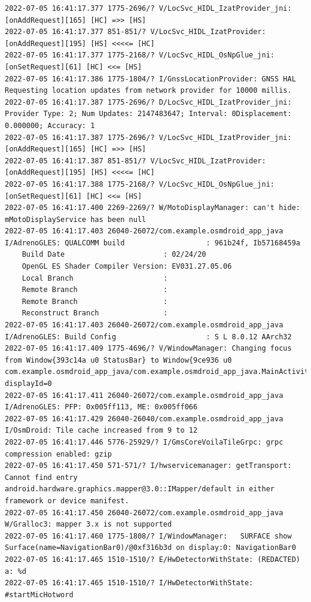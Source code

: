 \documentclass[a4paper,12pt]{book}
\begin{document}
\begin{lstlisting}
2022-07-05 16:41:17.377 1775-2696/? V/LocSvc_HIDL_IzatProvider_jni: [onAddRequest][165] [HC] =>> [HS]
2022-07-05 16:41:17.377 851-851/? V/LocSvc_HIDL_IzatProvider: [onAddRequest][195] [HS] <<<<= [HC]
2022-07-05 16:41:17.377 1775-2168/? V/LocSvc_HIDL_OsNpGlue_jni: [onSetRequest][61] [HC] <<= [HS]
2022-07-05 16:41:17.386 1775-1804/? I/GnssLocationProvider: GNSS HAL Requesting location updates from network provider for 10000 millis.
2022-07-05 16:41:17.387 1775-2696/? D/LocSvc_HIDL_IzatProvider_jni: Provider Type: 2; Num Updates: 2147483647; Interval: 0Displacement: 0.000000; Accuracy: 1
2022-07-05 16:41:17.387 1775-2696/? V/LocSvc_HIDL_IzatProvider_jni: [onAddRequest][165] [HC] =>> [HS]
2022-07-05 16:41:17.387 851-851/? V/LocSvc_HIDL_IzatProvider: [onAddRequest][195] [HS] <<<<= [HC]
2022-07-05 16:41:17.388 1775-2168/? V/LocSvc_HIDL_OsNpGlue_jni: [onSetRequest][61] [HC] <<= [HS]
2022-07-05 16:41:17.400 2269-2269/? W/MotoDisplayManager: can't hide: mMotoDisplayService has been null
2022-07-05 16:41:17.403 26040-26072/com.example.osmdroid_app_java I/AdrenoGLES: QUALCOMM build                   : 961b24f, Ib57168459a
    Build Date                       : 02/24/20
    OpenGL ES Shader Compiler Version: EV031.27.05.06
    Local Branch                     : 
    Remote Branch                    : 
    Remote Branch                    : 
    Reconstruct Branch               : 
2022-07-05 16:41:17.403 26040-26072/com.example.osmdroid_app_java I/AdrenoGLES: Build Config                     : S L 8.0.12 AArch32
2022-07-05 16:41:17.409 1775-4696/? V/WindowManager: Changing focus from Window{393c14a u0 StatusBar} to Window{9ce936 u0 com.example.osmdroid_app_java/com.example.osmdroid_app_java.MainActivity} displayId=0
2022-07-05 16:41:17.411 26040-26072/com.example.osmdroid_app_java I/AdrenoGLES: PFP: 0x005ff113, ME: 0x005ff066
2022-07-05 16:41:17.429 26040-26040/com.example.osmdroid_app_java I/OsmDroid: Tile cache increased from 9 to 12
2022-07-05 16:41:17.446 5776-25929/? I/GmsCoreVoilaTileGrpc: grpc compression enabled: gzip
2022-07-05 16:41:17.450 571-571/? I/hwservicemanager: getTransport: Cannot find entry android.hardware.graphics.mapper@3.0::IMapper/default in either framework or device manifest.
2022-07-05 16:41:17.450 26040-26072/com.example.osmdroid_app_java W/Gralloc3: mapper 3.x is not supported
2022-07-05 16:41:17.460 1775-1808/? I/WindowManager:   SURFACE show Surface(name=NavigationBar0)/@0xf316b3d on display:0: NavigationBar0
2022-07-05 16:41:17.465 1510-1510/? E/HwDetectorWithState: (REDACTED) a: %d
2022-07-05 16:41:17.465 1510-1510/? I/HwDetectorWithState: #startMicHotword

\end{lstlisting}
\end{document}
